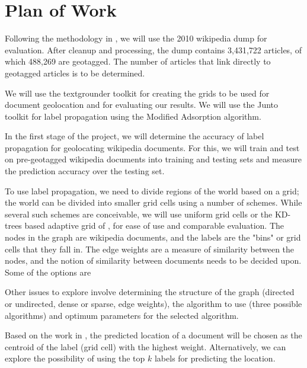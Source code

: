 \documentclass[11pt]{article}
\begin{document}


\section{Plan of Work}
Following the methodology in \cite{wing-baldridge:11}, we will use the 2010 wikipedia dump for evaluation. 
After cleanup and processing, the dump contains 3,431,722  articles, of which 488,269 are geotagged. 
The number of articles that link directly to geotagged articles is to be determined.

We will use the textgrounder \cite{textgrounder} toolkit for creating the grids to be used for document geolocation and for evaluating our results. 
We will use the Junto toolkit \cite{junto} for label propagation using the Modified Adsorption algorithm.

In the first stage of the project, we will determine the accuracy of label propagation for
geolocating wikipedia documents. For this, we will train and test on pre-geotagged wikipedia documents
into training and testing sets and measure the prediction accuracy over the testing set.

To use label propagation, we need to divide regions of the world based on a grid; 
the world can be divided into smaller grid cells using a number of schemes. 
While several such schemes are conceivable, we will use uniform grid cells or the 
KD-trees based adaptive grid of \cite{rolleretal:12}, for ease of use and comparable evaluation. 
The nodes in the graph are wikipedia documents, and the labels are the "bins" or 
grid cells that they fall in. The edge weights are a measure of similarity between the nodes, 
and the notion of similarity between documents needs to be decided upon. 
Some of the options are %

Other issues to explore involve determining the structure of the graph 
(directed or undirected, dense or sparse, edge weights), the algorithm to use 
(three possible algorithms) and optimum parameters for the selected algorithm. 

Based on the work in \cite{rolleretal:12}, the predicted location of a document will be chosen as the 
centroid of the label (grid cell) with the highest weight. Alternatively, we can explore the possibility of
using the top $k$ labels for predicting the location.
\end{document}
